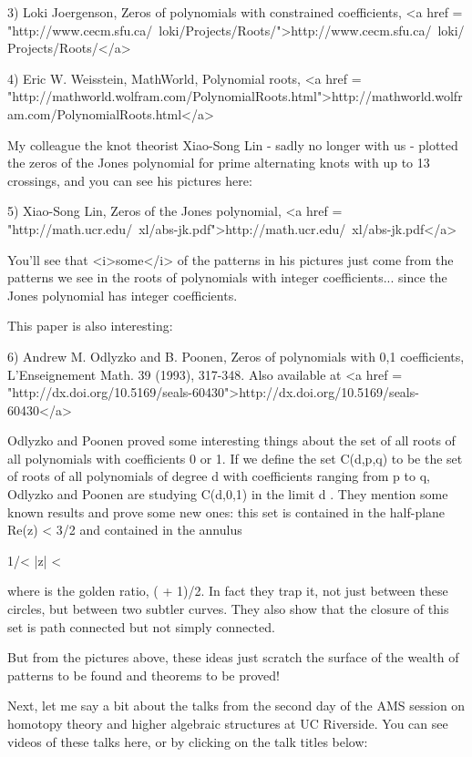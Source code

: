 3) Loki Joergenson, Zeros of polynomials with constrained coefficients,
<a href = "http://www.cecm.sfu.ca/~loki/Projects/Roots/">http://www.cecm.sfu.ca/~loki/Projects/Roots/</a>

4) Eric W. Weisstein, MathWorld, Polynomial roots, 
<a href = "http://mathworld.wolfram.com/PolynomialRoots.html">http://mathworld.wolfram.com/PolynomialRoots.html</a>

My colleague the knot theorist Xiao-Song Lin - sadly no longer with us
- plotted the zeros of the Jones polynomial for prime alternating
knots with up to 13 crossings, and you can see his pictures here:

5) Xiao-Song Lin, Zeros of the Jones polynomial,
<a href = "http://math.ucr.edu/~xl/abs-jk.pdf">http://math.ucr.edu/~xl/abs-jk.pdf</a>

You'll see that <i>some</i> of the patterns in his pictures just come from
the patterns we see in the roots of polynomials with integer
coefficients... since the Jones polynomial has integer coefficients.

This paper is also interesting:

6) Andrew M. Odlyzko and B. Poonen, Zeros of polynomials with 0,1
coefficients, L'Enseignement Math. 39 (1993), 317-348. Also available
at <a href = "http://dx.doi.org/10.5169/seals-60430">http://dx.doi.org/10.5169/seals-60430</a>

Odlyzko and Poonen proved some interesting things about the set of all
roots of all polynomials with coefficients 0 or 1.  If we define the
set C(d,p,q) to be the set of roots of all polynomials of degree d 
with coefficients ranging from p to q, Odlyzko and Poonen are 
studying C(d,0,1) in the limit d \to  \infty .  They mention some 
known results and prove some new ones: this set is contained in 
the half-plane Re(z) < 3/2 and contained in the annulus 

1/\Phi  < |z| < \Phi 

where \Phi  is the golden ratio, ( + 1)/2.  In fact they trap it,
not just between these circles, but between two subtler curves.  They
also show that the closure of this set is path connected but not
simply connected.

But from the pictures above, these ideas just scratch the surface
of the wealth of patterns to be found and theorems to be proved!

Next, let me say a bit about the talks from the second day of the 
AMS session on homotopy theory and higher algebraic structures at 
UC Riverside.  You can see videos of these talks here, or by clicking
on the talk titles below:

